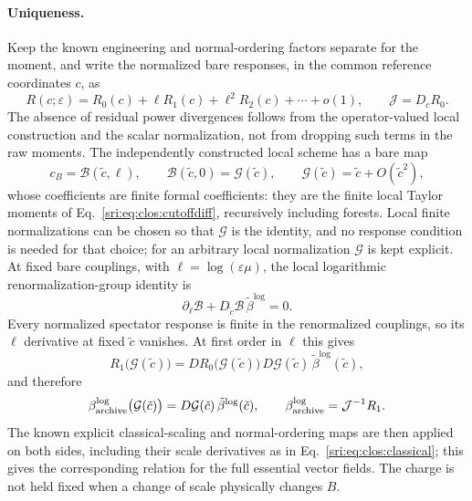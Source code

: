 \paragraph{Uniqueness.} Keep the known engineering and normal-ordering factors separate for the moment, and write the
normalized bare responses, in the common reference coordinates $c$, as
\begin{equation}
 R(c;\varepsilon)=R_0(c)+\ell R_1(c)+\ell^2R_2(c)+\cdots+o(1),\qquad \mathcal J=D_cR_0 .
 \label{sri:eq:clos:Rexp}
\end{equation}
The absence of residual power divergences follows from the operator-valued local construction and the scalar
normalization, not from dropping such terms in the raw moments. The independently constructed local scheme has a bare
map
\begin{equation}
 c_B=\mathcal B(\tilde c,\ell),\qquad \mathcal B(\tilde c,0)=\mathcal G(\tilde c),\qquad
 \mathcal G(\tilde c)=\tilde c+O(\tilde c^2),
\end{equation}
whose coefficients are finite formal coefficients: they are the finite local Taylor moments of
Eq.~\eqref{sri:eq:clos:cutoffdiff}, recursively including forests. Local finite normalizations can be chosen so that
$\mathcal G$ is the identity, and no response condition is needed for that choice; for an arbitrary local normalization
$\mathcal G$ is kept explicit. At fixed bare couplings, with $\ell=\log(\varepsilon\mu)$, the local logarithmic
renormalization-group identity is
\begin{equation}
 \partial_\ell\mathcal B+D_{\tilde c}\mathcal B\,\tilde\beta^{\log}=0 .
\end{equation}
Every normalized spectator response is finite in the renormalized couplings, so its $\ell$ derivative at fixed
$\tilde c$ vanishes. At first order in $\ell$ this gives
\begin{equation}
 R_1\bigl(\mathcal G(\tilde c)\bigr)=DR_0\bigl(\mathcal G(\tilde c)\bigr)\,D\mathcal G(\tilde c)\,
 \tilde\beta^{\log}(\tilde c),
 \label{sri:eq:clos:localtoR}
\end{equation}
and therefore
\begin{equation}
 \beta^{\log}_{\rm archive}\bigl(\mathcal G(\tilde c)\bigr)=D\mathcal G(\tilde c)\,\tilde\beta^{\log}(\tilde c),
 \qquad \beta^{\log}_{\rm archive}=\mathcal J^{-1}R_1 .
 \label{sri:eq:clos:equivalence}
\end{equation}
The known explicit classical-scaling and normal-ordering maps are then applied on both sides, including their scale
derivatives as in Eq.~\eqref{sri:eq:clos:classical}; this gives the corresponding relation for the full essential vector
fields. The charge is not held fixed when a change of scale physically changes $B$.

